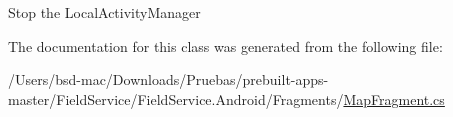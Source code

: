 Stop the Local\+Activity\+Manager 



The documentation for this class was generated from the following file\+:\begin{DoxyCompactItemize}
\item 
/\+Users/bsd-\/mac/\+Downloads/\+Pruebas/prebuilt-\/apps-\/master/\+Field\+Service/\+Field\+Service.\+Android/\+Fragments/\hyperlink{_map_fragment_8cs}{Map\+Fragment.\+cs}\end{DoxyCompactItemize}
